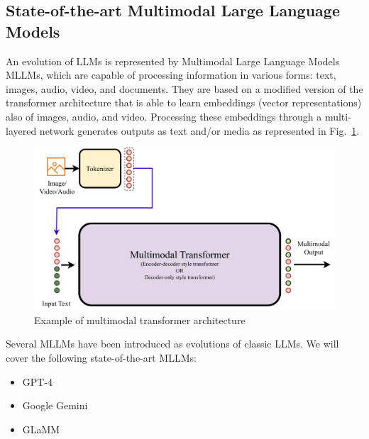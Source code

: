 \subsection{State-of-the-art Multimodal Large Language Models}
An evolution of LLMs is represented by Multimodal Large Language Models MLLMs, which are capable of processing information in various forms: text, images, audio, video, and documents.
They are based on a modified version of the transformer architecture that is able to learn embeddings (vector representations) also of images, audio, and video. 
Processing these embeddings through a multi-layered network generates outputs as text and/or media \cite{wadekar2024evolution} as represented in Fig.~\ref{fig:21}.
\begin{figure}[H]
    \centering
    \includegraphics[width=0.9\linewidth]{Figures/fig_21.png}
    \caption{Example of multimodal transformer architecture}
    \label{fig:21}
\end{figure}

Several MLLMs have been introduced as evolutions of classic LLMs.
We will cover the following state-of-the-art MLLMs:
\begin{itemize}
    \item GPT-4
    \item Google Gemini 
    \item GLaMM
\end{itemize}

